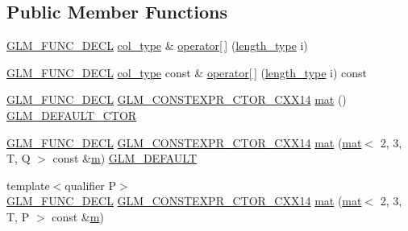 \subsection*{Public Member Functions}
\begin{DoxyCompactItemize}
\item 
\mbox{\hyperlink{setup_8hpp_ab2d052de21a70539923e9bcbf6e83a51}{G\+L\+M\+\_\+\+F\+U\+N\+C\+\_\+\+D\+E\+CL}} \mbox{\hyperlink{structglm_1_1mat_3_012_00_013_00_01_t_00_01_q_01_4_aebe4faf14ea1bc3092b4bbf591d7194e}{col\+\_\+type}} \& \mbox{\hyperlink{structglm_1_1mat_3_012_00_013_00_01_t_00_01_q_01_4_a946520cc2889c97e6841cbf5c36ee715}{operator\mbox{[}$\,$\mbox{]}}} (\mbox{\hyperlink{structglm_1_1mat_3_012_00_013_00_01_t_00_01_q_01_4_ad2e2433ba375abcd6bada873f8ea2de1}{length\+\_\+type}} i)
\item 
\mbox{\hyperlink{setup_8hpp_ab2d052de21a70539923e9bcbf6e83a51}{G\+L\+M\+\_\+\+F\+U\+N\+C\+\_\+\+D\+E\+CL}} \mbox{\hyperlink{structglm_1_1mat_3_012_00_013_00_01_t_00_01_q_01_4_aebe4faf14ea1bc3092b4bbf591d7194e}{col\+\_\+type}} const  \& \mbox{\hyperlink{structglm_1_1mat_3_012_00_013_00_01_t_00_01_q_01_4_abef4a7f73eb38bb050aad6894e1189d8}{operator\mbox{[}$\,$\mbox{]}}} (\mbox{\hyperlink{structglm_1_1mat_3_012_00_013_00_01_t_00_01_q_01_4_ad2e2433ba375abcd6bada873f8ea2de1}{length\+\_\+type}} i) const
\item 
\mbox{\hyperlink{setup_8hpp_ab2d052de21a70539923e9bcbf6e83a51}{G\+L\+M\+\_\+\+F\+U\+N\+C\+\_\+\+D\+E\+CL}} \mbox{\hyperlink{setup_8hpp_a0900f9145e68bf6061b6f5e7be3fa751}{G\+L\+M\+\_\+\+C\+O\+N\+S\+T\+E\+X\+P\+R\+\_\+\+C\+T\+O\+R\+\_\+\+C\+X\+X14}} \mbox{\hyperlink{structglm_1_1mat_3_012_00_013_00_01_t_00_01_q_01_4_a895bbb293e0af4e6f3fdc032e736e4eb}{mat}} () \mbox{\hyperlink{setup_8hpp_afb97a4e995bc004c0cbbfa22125b80ba}{G\+L\+M\+\_\+\+D\+E\+F\+A\+U\+L\+T\+\_\+\+C\+T\+OR}}
\item 
\mbox{\hyperlink{setup_8hpp_ab2d052de21a70539923e9bcbf6e83a51}{G\+L\+M\+\_\+\+F\+U\+N\+C\+\_\+\+D\+E\+CL}} \mbox{\hyperlink{setup_8hpp_a0900f9145e68bf6061b6f5e7be3fa751}{G\+L\+M\+\_\+\+C\+O\+N\+S\+T\+E\+X\+P\+R\+\_\+\+C\+T\+O\+R\+\_\+\+C\+X\+X14}} \mbox{\hyperlink{structglm_1_1mat_3_012_00_013_00_01_t_00_01_q_01_4_a6b574b8414d3902192ded677b5476562}{mat}} (\mbox{\hyperlink{structglm_1_1mat}{mat}}$<$ 2, 3, T, Q $>$ const \&\mbox{\hyperlink{_s_d_l__opengl__glext_8h_af593500c283bf1a787a6f947f503a5c2}{m}}) \mbox{\hyperlink{setup_8hpp_aefce7051c376a64ba89fa93a9f63bc2c}{G\+L\+M\+\_\+\+D\+E\+F\+A\+U\+LT}}
\item 
{\footnotesize template$<$qualifier P$>$ }\\\mbox{\hyperlink{setup_8hpp_ab2d052de21a70539923e9bcbf6e83a51}{G\+L\+M\+\_\+\+F\+U\+N\+C\+\_\+\+D\+E\+CL}} \mbox{\hyperlink{setup_8hpp_a0900f9145e68bf6061b6f5e7be3fa751}{G\+L\+M\+\_\+\+C\+O\+N\+S\+T\+E\+X\+P\+R\+\_\+\+C\+T\+O\+R\+\_\+\+C\+X\+X14}} \mbox{\hyperlink{structglm_1_1mat_3_012_00_013_00_01_t_00_01_q_01_4_abeb4c8e27fcf703c9944917ee1a10887}{mat}} (\mbox{\hyperlink{structglm_1_1mat}{mat}}$<$ 2, 3, T, P $>$ const \&\mbox{\hyperlink{_s_d_l__opengl__glext_8h_af593500c283bf1a787a6f947f503a5c2}{m}})

\end{DoxyCompactItemize}

